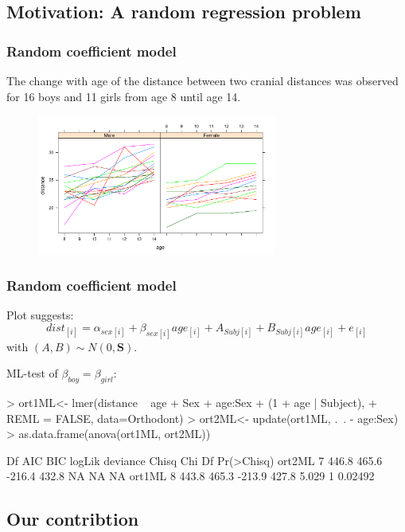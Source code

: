 \subsection{Motivation: A random regression problem}
\begin{sframe}
  \frametitle{Random coefficient model}

  The change with age  of the distance between two cranial
distances was
observed for 16 boys and 11 girls
from age 8 until age 14.

\begin{figure}[ht]
 \centering
 \includegraphics[width=0.7\textwidth]{fig/ortfig01}\\[-0.5cm]
 \label{fig:ortfig01}
\end{figure}
\end{sframe}

\begin{sframe}
  \frametitle{Random coefficient model}
  Plot suggests:
\[
dist_{[i]} = \alpha_{sex[i]}
+ \beta_{sex[i]} age_{[i]} + A_{Subj[i]} +
B_{Subj[i]} age_{[i]} + e_{[i]}
\]
with $(A,B) \sim N(0,\bm S)$.

ML-test of $\beta_{boy}=\beta_{girl}$:
\begin{Schunk}
\begin{Sinput}
> ort1ML<- lmer(distance ~ age + Sex + age:Sex + (1 + age | Subject),
+                   REML = FALSE, data=Orthodont)
> ort2ML<- update(ort1ML, .~. - age:Sex)
> as.data.frame(anova(ort1ML, ort2ML))
\end{Sinput}
\begin{Soutput}
       Df   AIC   BIC logLik deviance Chisq Chi Df Pr(>Chisq)
ort2ML  7 446.8 465.6 -216.4    432.8    NA     NA         NA
ort1ML  8 443.8 465.3 -213.9    427.8 5.029      1    0.02492
\end{Soutput}
\end{Schunk}
\end{sframe}


\subsection{Our contribtion}
\label{sec:packages-we-need}



